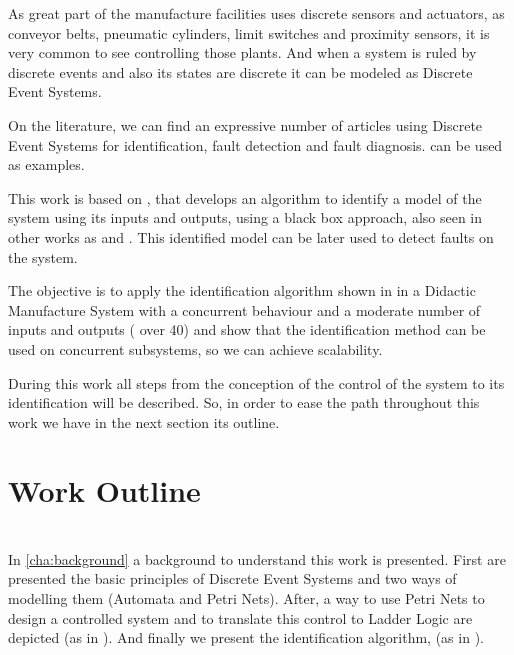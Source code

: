
As great part of the manufacture facilities uses discrete sensors and actuators,
as conveyor belts, pneumatic cylinders, limit switches and proximity sensors, it
is very common to see \PLCs{} controlling those plants. And when a system is ruled
by discrete events and also its states are discrete it can be modeled as
Discrete Event Systems.

On the literature, we can find an expressive number of articles using Discrete
Event Systems for identification, fault detection and fault diagnosis.
\cite{veras2018distributed,cabral2017synchronous,kumar2014comments,klein2005fault}
can be used as examples.

This work is based on \cite{moreira2018enhanced}, that
develops an algorithm to identify a model of the system using its inputs
and outputs, using a black box approach, also seen in other works as
\cite{klein2005fault} and \cite{roth2009fdi}. This identified model can be later
used to detect faults on the system.

The objective is to apply the identification algorithm shown in
\cite{moreira2018enhanced} in a Didactic Manufacture System with a
concurrent behaviour and a moderate number of inputs and outputs ( over 40) and
show that the identification method can be used on concurrent subsystems, so we can
achieve scalability.


During this work all steps from the conception of the control of the system to
its identification will be described. So, in order to ease the path throughout
this work we have in the next section its outline.

\section{Work Outline}
\label{sec:thesisOutline}

\paragraph{} ~\\
In \autoref{cha:background} a background to understand
this work is presented. First are presented the basic principles of Discrete
Event Systems and two
ways of modelling them (Automata and Petri Nets). After, a way to use Petri Nets to design
a controlled system and to translate this control to Ladder Logic are depicted (as
in \cite{moreira2013bridging}).
And finally we present the identification algorithm,
\DAOCT{} (as in \cite{moreira2018enhanced}).

